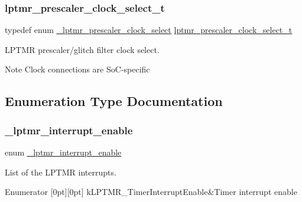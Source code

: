 \subsubsection{\texorpdfstring{lptmr\_prescaler\_clock\_select\_t}{lptmr\_prescaler\_clock\_select\_t}}
{\footnotesize\ttfamily typedef enum \mbox{\hyperlink{group__lptmr_ga68d8b01f0167f938bfa86442f4772ced}{\+\_\+lptmr\+\_\+prescaler\+\_\+clock\+\_\+select}}  \mbox{\hyperlink{group__lptmr_ga63bfd703c032aeb0820e8131c4720cb8}{lptmr\+\_\+prescaler\+\_\+clock\+\_\+select\+\_\+t}}}



L\+P\+T\+MR prescaler/glitch filter clock select. 

\begin{DoxyNote}{Note}
Clock connections are So\+C-\/specific 
\end{DoxyNote}


\subsection{Enumeration Type Documentation}
\mbox{\label{group__lptmr_gade9e5cb91c7534d9b9ac51909edae02e}} 
\subsubsection{\texorpdfstring{\_lptmr\_interrupt\_enable}{\_lptmr\_interrupt\_enable}}
{\footnotesize\ttfamily enum \mbox{\hyperlink{group__lptmr_gade9e5cb91c7534d9b9ac51909edae02e}{\+\_\+lptmr\+\_\+interrupt\+\_\+enable}}}



List of the L\+P\+T\+MR interrupts. 

\begin{DoxyEnumFields}{Enumerator}
[0pt][0pt]{}\mbox{\label{group__lptmr_ggade9e5cb91c7534d9b9ac51909edae02ea6788e58f3d338bb386463f092e5d94f3}} 
k\+L\+P\+T\+M\+R\+\_\+\+Timer\+Interrupt\+Enable&Timer interrupt enable \\
\hline

\end{DoxyEnumFields}
\mbox{\label{group__lptmr_ga9bd2404c984ac5eea420a396e7cdda77}} 
